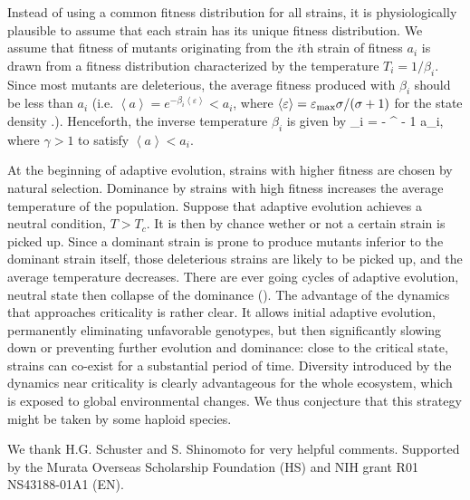 \documentclass[amsmath,amssymb,floatf
ix]{revtex4}
\begin{document}
Instead of using a common fitness distribution for all strains, it
is physiologically plausible to assume that each strain has its
unique fitness distribution. We assume that fitness of mutants originating
from the $i$th strain of fitness $a_i$ is drawn from a fitness distribution
characterized by the temperature $T_i = 1/\beta_i$.
Since most mutants are deleterious, the average fitness
produced with $\beta_i$ should be less than $a_i$ (i.e. $\left\langle
a \right\rangle = e^{ - \beta_i \left\langle \varepsilon
\right\rangle }< a_i$, where $\left\langle \varepsilon \right\rangle
= \varepsilon _{\max } {\sigma \mathord{\left/ {\vphantom {\sigma
{\left( {\sigma + 1} \right)}}} \right.  \kern-\nulldelimiterspace}
{\left( {\sigma + 1} \right)}}$ for the state density
.). Henceforth, the inverse temperature $\beta_i$ is given by
\be\label{40} \beta _i = - \gamma \left\langle \varepsilon
\right\rangle ^{ - 1} \ln a_i, \en where $\gamma > 1$ to satisfy
$\left\langle a \right\rangle < a_i$.

At the beginning of adaptive evolution, strains with higher fitness are
chosen by natural selection. Dominance by strains with high fitness
increases the average temperature of the population. Suppose that
adaptive evolution achieves a neutral condition, $T>T_c$. It is then by
chance wether or not a certain strain is picked up. Since a dominant
strain is prone to produce mutants inferior to the dominant strain
itself, those deleterious strains are likely to be picked up, and the
average temperature decreases.
There are ever going cycles of adaptive evolution, neutral state then collapse of the dominance ().
The advantage of the dynamics that approaches
criticality is rather clear. It allows initial adaptive evolution,
permanently eliminating unfavorable genotypes, but then significantly
slowing down or preventing further evolution
and dominance: close to the  critical state,
strains can co-exist for a substantial period of time.
Diversity introduced by the dynamics near criticality is clearly advantageous for the whole
ecosystem, which is exposed to global environmental changes. We thus conjecture that this strategy might be taken by some haploid species.

We thank H.G. Schuster and S. Shinomoto for very helpful
comments. Supported by the Murata Overseas Scholarship Foundation (HS)
and NIH grant R01 NS43188-01A1 (EN).


\end{document}
